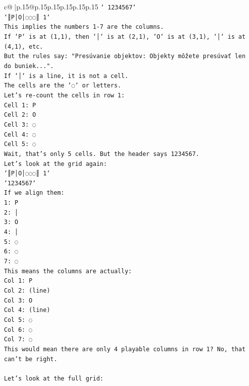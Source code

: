 \documentclass{article}
\begin{document}
{\begin{supertabular}{c@{$\;$}|p{.15\linewidth}@{}p{.15\linewidth}p{.15\linewidth}p{.15\linewidth}p{.15\linewidth}p{.15\linewidth}}
{{{\texttt{` 1234567`} \\
\texttt{`║P│O│◌◌◌║ 1`} \\
\texttt{This implies the numbers 1{-}7 are the columns.} \\
\texttt{If `P` is at (1,1), then `│` is at (2,1), `O` is at (3,1), `│` is at (4,1), etc.} \\
\texttt{But the rules say: "Presúvanie objektov: Objekty môžete presúvať len do buniek...".} \\
\texttt{If `│` is a line, it is not a cell.} \\
\texttt{The cells are the `◌` or letters.} \\
\texttt{Let's re{-}count the cells in row 1:} \\
\texttt{Cell 1: P} \\
\texttt{Cell 2: O} \\
\texttt{Cell 3: ◌} \\
\texttt{Cell 4: ◌} \\
\texttt{Cell 5: ◌} \\
\texttt{Wait, that's only 5 cells. But the header says 1234567.} \\
\texttt{Let's look at the grid again:} \\
\texttt{`║P│O│◌◌◌║ 1`} \\
\texttt{`1234567`} \\
\texttt{If we align them:} \\
\texttt{1: P} \\
\texttt{2: │} \\
\texttt{3: O} \\
\texttt{4: │} \\
\texttt{5: ◌} \\
\texttt{6: ◌} \\
\texttt{7: ◌} \\
\texttt{This means the columns are actually:} \\
\texttt{Col 1: P} \\
\texttt{Col 2: (line)} \\
\texttt{Col 3: O} \\
\texttt{Col 4: (line)} \\
\texttt{Col 5: ◌} \\
\texttt{Col 6: ◌} \\
\texttt{Col 7: ◌} \\
\texttt{This would mean there are only 4 playable columns in row 1? No, that can't be right.} \\
\\ 
\texttt{Let's look at the full grid:} \\
}}}
\end{supertabular}}
\end{document}
